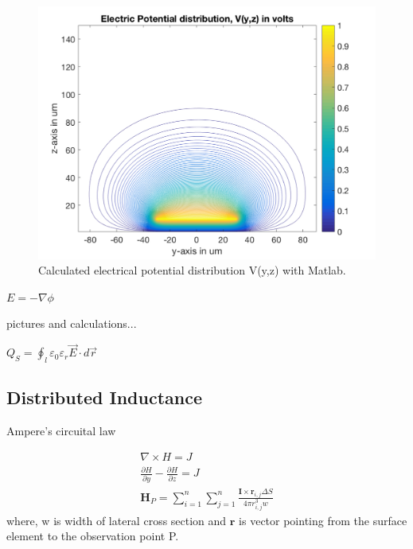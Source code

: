 \documentclass[11pt,final]{scrbook}
\begin{document}
\begin{figure}[htbp]
\begin{center}
\includegraphics[scale=0.3]{TL_C.pdf}
\caption{Calculated electrical potential distribution V(y,z) with Matlab.}
\label{fig:Gauss2D}
\end{center}
\end{figure}

$E=-\nabla \phi$

pictures and calculations...

${ Q }_{ S }=\oint _{ l }{\varepsilon_{0}\varepsilon_{r}\overrightarrow { E } \cdot d\overrightarrow { r } } $
\subsection{Distributed Inductance}
Ampere’s circuital law

\begin{align}
\nabla \times H=J\\
 \frac { \partial H }{ \partial y } -\frac { \partial H }{ \partial z } =J\\
 \textbf{H}_{P}=\sum _{ i=1 }^{ n }{ \sum _{ j=1 }^{ n }{ \frac { \textbf{I}\times { \textbf{r} }_{ i,j }\Delta S }{ 4\pi { r }_{ i,j }^{ 3 }w }  }  } 
 \end{align}
 where, w is width of lateral cross section and $\textbf{r}$ is vector pointing from the surface element to the observation point P.
\end{document}
